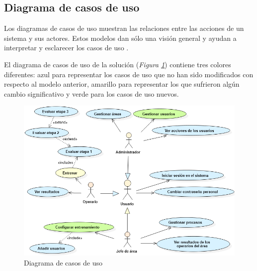 \subsection{Diagrama de casos de uso}
Los diagramas de casos de uso muestran las relaciones entre las acciones de un sistema y sus actores. Estos modelos dan sólo una visión general y ayudan a interpretar y esclarecer los casos de uso \cite{Kalaivani2004}.

El diagrama de casos de uso de la solución (\textsl{Figura \ref{fig:dcu}}) contiene tres colores diferentes: azul para representar los casos de uso que no han sido modificados con respecto al modelo anterior, amarillo para representar los que sufrieron algún cambio significativo y verde para los casos de uso nuevos.

\begin{figure}[h]
\centering
 \includegraphics[width=0.7\linewidth]{imagen/dcu.png}
 \caption{Diagrama de casos de uso}
 \label{fig:dcu} 
\end{figure}